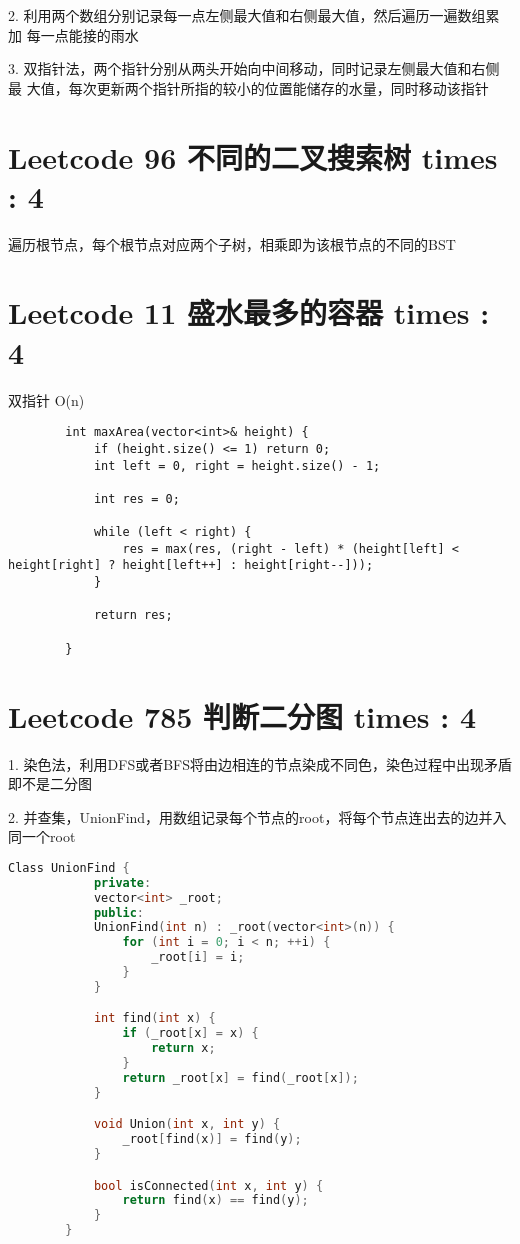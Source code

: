\documentclass[UTF8]{ctexart}
\begin{document}
2. 利用两个数组分别记录每一点左侧最大值和右侧最大值，然后遍历一遍数组累加
每一点能接的雨水

3. 双指针法，两个指针分别从两头开始向中间移动，同时记录左侧最大值和右侧最
大值，每次更新两个指针所指的较小的位置能储存的水量，同时移动该指针

\section{Leetcode 96 不同的二叉搜索树 times : 4}
遍历根节点，每个根节点对应两个子树，相乘即为该根节点的不同的BST

\section{Leetcode 11 盛水最多的容器 times : 4}
双指针 O(n)
\begin{framed}
	\begin{lstlisting}
		int maxArea(vector<int>& height) {
			if (height.size() <= 1) return 0;
			int left = 0, right = height.size() - 1;

			int res = 0;

			while (left < right) {
				res = max(res, (right - left) * (height[left] < height[right] ? height[left++] : height[right--]));
			}

			return res;

		}
	\end{lstlisting}
\end{framed}

\section{Leetcode 785 判断二分图 times : 4}
1. 染色法，利用DFS或者BFS将由边相连的节点染成不同色，染色过程中出现矛盾即不是二分图

2. 并查集，UnionFind，用数组记录每个节点的root，将每个节点连出去的边并入同一个root
\begin{framed}
	\begin{lstlisting}[language=C++]
		Class UnionFind {
			private:
			vector<int> _root;
			public:
			UnionFind(int n) : _root(vector<int>(n)) {
				for (int i = 0; i < n; ++i) {
					_root[i] = i;
				}
			}

			int find(int x) {
				if (_root[x] = x) {
					return x;
				}
				return _root[x] = find(_root[x]);
			}

			void Union(int x, int y) {
				_root[find(x)] = find(y);
			}

			bool isConnected(int x, int y) {
				return find(x) == find(y);
			}
		}
	\end{lstlisting}
\end{framed}
\end{document}
